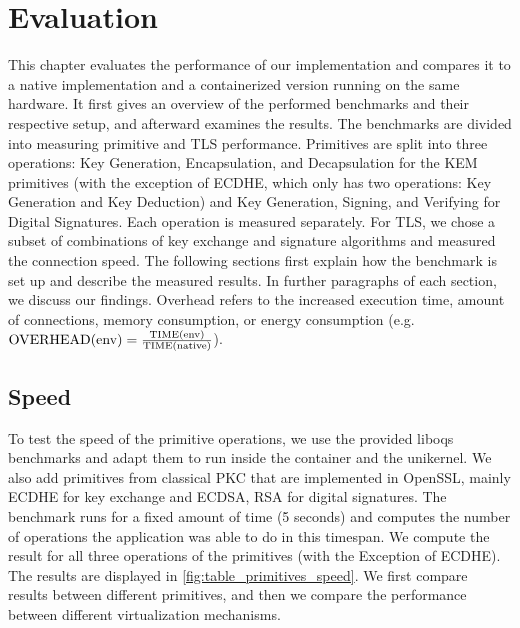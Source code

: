 \documentclass[public,noindent]{aisecreport}
\begin{document}
\chapter{Evaluation}
\label{chapter:evaluation}

This chapter evaluates the performance of our implementation and compares it to a native implementation and a containerized version running on the same hardware. It first gives an overview of the performed benchmarks and their respective setup, and afterward examines the results. The benchmarks are divided into measuring primitive and TLS performance. Primitives are split into three operations: Key Generation, Encapsulation, and Decapsulation for the KEM primitives (with the exception of ECDHE, which only has two operations: Key Generation and Key Deduction) and Key Generation, Signing, and Verifying for Digital Signatures. Each operation is measured separately. For TLS, we chose a subset of combinations of key exchange and signature algorithms and measured the connection speed. The following sections first explain how the benchmark is set up and describe the measured results. In further paragraphs of each section, we discuss our findings. Overhead refers to the increased execution time, amount of connections, memory consumption, or energy consumption (e.g. $\textnormal{OVERHEAD}(\textnormal{env}) = \frac{\textnormal{TIME}(\textnormal{env})}{\textnormal{TIME}(\textnormal{native})}$).

\section{Speed}

To test the speed of the primitive operations, we use the provided liboqs benchmarks and adapt them to run inside the container and the unikernel. We also add primitives from classical PKC that are implemented in OpenSSL, mainly ECDHE for key exchange and ECDSA, RSA for digital signatures. The benchmark runs for a fixed amount of time (5 seconds) and computes the number of operations the application was able to do in this timespan. We compute the result for all three operations of the primitives (with the Exception of ECDHE). The results are displayed in \ref{fig:table_primitives_speed}. We first compare results between different primitives, and then we compare the performance between different virtualization mechanisms. 
\end{document}
